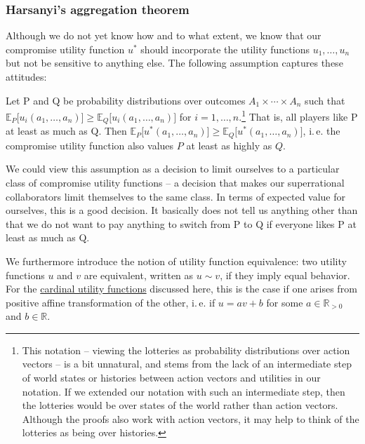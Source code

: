 \subsubsection{Harsanyi's aggregation
theorem}\label{harsanyis-aggregation-theorem}

Although we do not yet know how and to what extent, we know that our
compromise utility function \(u^{*}\) should incorporate the utility
functions \(u_{1},\dotsc,u_{n}\) but not be sensitive to anything else. The
following assumption captures these attitudes:

\vspace{3mm}

\begin{assumption}
\label{ass:compromise_util}
Let P and Q be probability distributions over outcomes \(A_{1} \times
\dotsm \times A_{n}\) such that \(\mathbb{E}_{P}\lbrack u_{i}(a_{1},\dotsc,a_{n})\rbrack \geq
\mathbb{E}_{Q}\lbrack u_{i}(a_{1},\dotsc,a_{n})\rbrack\) for \(i = 1,\dotsc,n\).\footnote{This notation --
    viewing the lotteries as probability distributions over action vectors -- is a bit unnatural,
    and stems from the lack of an intermediate step of world states or histories between action
    vectors and utilities in our notation. If we extended our notation with such an intermediate
    step, then the lotteries would be over states of the world rather than action vectors. Although
the proofs also work with action vectors, it may help to think of the lotteries as being over
histories.} That is, all players like P at least as much as Q. Then \(\mathbb{E}_{P}\lbrack
u^{*}(a_{1},\dotsc,a_{n})\rbrack \geq \mathbb{E}_{Q}\lbrack u^{*}(a_{1},\dotsc,a_{n})\rbrack\), i.\,e. the
compromise utility function also values \(P\) at least as highly as \(Q\).
\end{assumption}

We could view this assumption as a decision to limit ourselves to a
particular class of compromise utility functions -- a decision that
makes our superrational collaborators limit themselves to the same
class. In terms of expected value for ourselves, this is a good
decision. It basically does not tell us anything other than that we do
not want to pay anything to switch from P to Q if everyone likes P at
least as much as Q.

We furthermore introduce the notion of utility function equivalence: two
utility functions \(u\) and \(v\) are equivalent, written as
\(u \sim v\), if they imply equal behavior. For the
\href{https://en.wikipedia.org/wiki/Cardinal_utility}{cardinal
utility functions} discussed here, this is the case if one arises from
positive affine transformation of the other, i.\,e. if \(u = av + b\) for
some \(a \in \mathbb{R}_{> 0}\) and \(b \in \mathbb{R}\).

